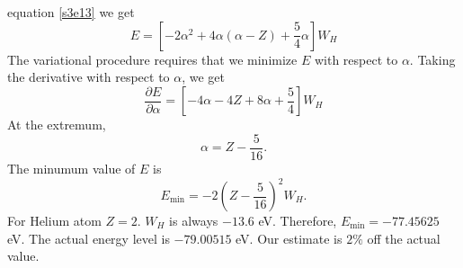 \documentclass{article}
\numberwithin{equation}{section}
\begin{document}
equation \eqref{s3e13} we get
\begin{equation}\label{s3e19}
E = \left[-2\alpha^2 + 4\alpha(\alpha - Z) + \frac{5}{4}\alpha\right]W_H
\end{equation}
The variational procedure requires that we minimize $E$ with respect to $\alpha$.
Taking the derivative with respect to $\alpha$, we get
\[
\frac{\partial E}{\partial \alpha} = \left[-4\alpha - 4Z + 8\alpha + \frac{5}{4}\right]W_H
\]
At the extremum,
\begin{equation}\label{s3e20}
\alpha = Z - \frac{5}{16}.
\end{equation}
The minumum value of $E$ is
\begin{equation}\label{s3e21}
E_{\text{min}} = -2\left(Z - \frac{5}{16}\right)^2W_H.
\end{equation}
For Helium atom $Z = 2$. $W_H$ is always $-13.6$ eV. Therefore, $E_{\text{min}} 
= -77.45625$ eV. The actual energy level is $-79.00515$ eV. Our estimate is
$2\%$ off the actual value.
\end{document}
